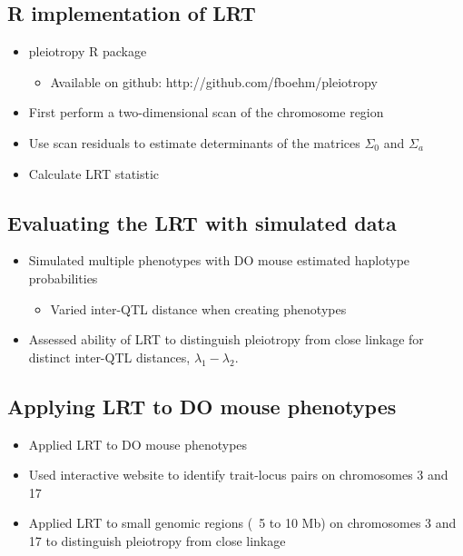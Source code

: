 \documentclass[a0,landscape]{a0poster}
\begin{document}
\begin{multicols}{4}
\subsection*{R implementation of LRT}
\begin{itemize}
\item pleiotropy R package \cite{boehm2016pleiotropy}
\begin{itemize}
\item Available on github: http://github.com/fboehm/pleiotropy
\end{itemize}
\item First perform a two-dimensional scan of the chromosome region
\item Use scan residuals to estimate determinants of the matrices $\Sigma_0$ and $\Sigma_a$
\item Calculate LRT statistic
\end{itemize}

\subsection*{Evaluating the LRT with simulated data}

\begin{itemize}
\item Simulated multiple phenotypes with DO mouse estimated haplotype probabilities
\begin{itemize}
\item Varied inter-QTL distance when creating phenotypes
\end{itemize}
\item Assessed ability of LRT to distinguish pleiotropy from close linkage for distinct inter-QTL distances, $\lambda_1 - \lambda_2$.
\end{itemize}

\subsection*{Applying LRT to DO mouse phenotypes}

\begin{itemize}
\item Applied LRT to DO mouse phenotypes
\item Used interactive website to identify trait-locus pairs on chromosomes 3 and 17
\item Applied LRT to small genomic regions (~5 to 10 Mb) on chromosomes 3 and 17 to distinguish pleiotropy from close linkage
\end{itemize}


\end{multicols}
\end{document}
